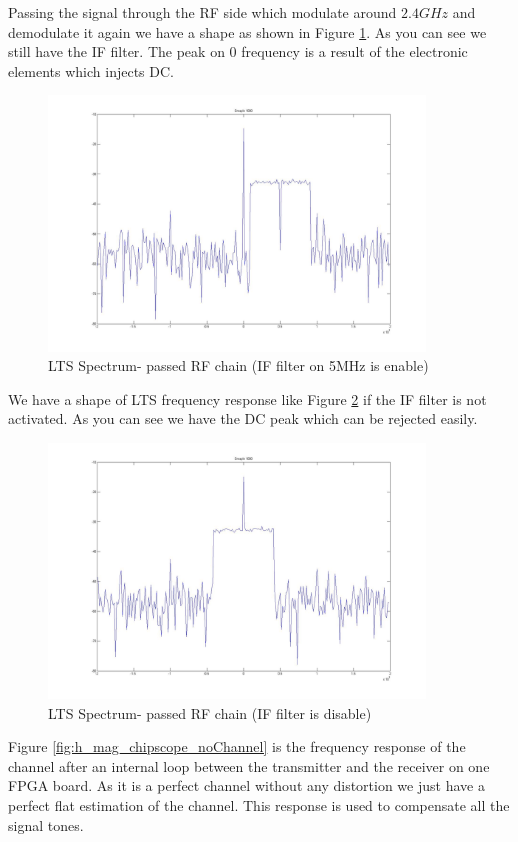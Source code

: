 Passing the signal through the RF side which modulate around $2.4 GHz$ and demodulate it again we have a shape as shown in Figure \ref{fig:RfIF}. As you can see we still have the IF filter. The peak on 0 frequency is a result of the electronic elements which injects DC.\\

\begin{figure}
\centering
\includegraphics[width=10cm]{content/fig/RfIF.JPG}
\caption{LTS Spectrum- passed RF chain (IF filter  on 5MHz is enable)}
\label{fig:RfIF}
\end{figure}

We have a shape of LTS frequency response like Figure \ref{fig:Rfbase} if the IF filter is not activated. As you can see we have the DC peak which can be rejected easily.\\

\begin{figure}
\centering
\includegraphics[width=10cm]{content/fig/Rfbase.JPG}
\caption{LTS Spectrum- passed RF chain (IF filter is disable)}
\label{fig:Rfbase}
\end{figure}

Figure \ref{fig:h_mag_chipscope_noChannel} is the frequency response of the channel after an internal loop between the transmitter and the receiver on one FPGA board. As it is a perfect channel without any distortion we just have a perfect flat estimation of the channel. This response is used to compensate all the signal tones.\\

